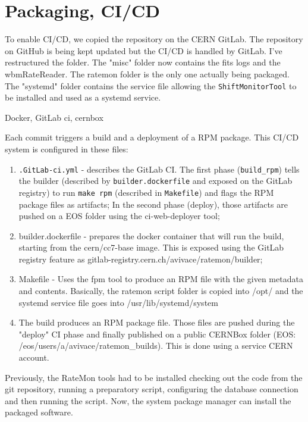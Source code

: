 \section{Packaging, CI/CD}

To enable CI/CD, we copied the repository on the CERN GitLab. The repository on GitHub is being kept updated but the CI/CD is handled by GitLab.
I've restructured the folder. The "misc" folder now contains the fits logs and the wbmRateReader. The ratemon folder is the only one actually being packaged. The "systemd" folder contains the service file allowing the \texttt{ShiftMonitorTool} to be installed and used as a systemd service.

Docker, GitLab ci, cernbox

Each commit triggers a build and a deployment of a RPM package. This CI/CD system is configured in these files:

\begin{enumerate}
	\item \texttt{.GitLab-ci.yml} - describes the GitLab CI. The first phase (\texttt{build\_rpm}) tells the builder (described by \texttt{builder.dockerfile} and exposed on the GitLab registry) to run \texttt{make rpm} (described in \texttt{Makefile}) and flags the RPM package files as artifacts; In the second phase (deploy), those artifacts are pushed on a EOS folder using the ci-web-deployer tool;
	\item builder.dockerfile - prepares the docker container that will run the build, starting from the cern/cc7-base image. This is exposed using the GitLab registry feature as gitlab-registry.cern.ch/avivace/ratemon/builder;
	\item Makefile - Uses the fpm tool to produce an RPM file with the given metadata and contents. Basically, the ratemon script folder is copied into /opt/ and the systemd service file goes into /usr/lib/systemd/system

	\item The build produces an RPM package file. Those files are pushed during the "deploy" CI phase and finally published on a public CERNBox folder (EOS: /eos/users/a/avivace/ratemon\_builds). This is done using a service CERN account.
\end{enumerate}

Previously, the RateMon tools had to be installed checking out the code from the git repository, running a preparatory script, configuring the database connection and then running the script. Now, the system package manager can install the packaged software.

